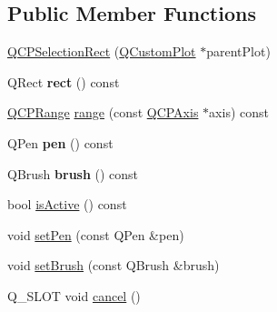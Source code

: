 \subsection*{Public Member Functions}
\begin{DoxyCompactItemize}
\item 
\mbox{\hyperlink{class_q_c_p_selection_rect_ade6ee59fabcc585a1e281eb527b01867}{Q\+C\+P\+Selection\+Rect}} (\mbox{\hyperlink{class_q_custom_plot}{Q\+Custom\+Plot}} $\ast$parent\+Plot)
\item 
\mbox{\label{class_q_c_p_selection_rect_a3812115ae4dfe2855bf1e58331c14805}} 
Q\+Rect {\bfseries rect} () const
\item 
\mbox{\hyperlink{class_q_c_p_range}{Q\+C\+P\+Range}} \mbox{\hyperlink{class_q_c_p_selection_rect_a23ab082ffa04be1dbf9afb9e633ab815}{range}} (const \mbox{\hyperlink{class_q_c_p_axis}{Q\+C\+P\+Axis}} $\ast$axis) const
\item 
\mbox{\label{class_q_c_p_selection_rect_ab4229f8faeaffba9617d2e6c4779b765}} 
Q\+Pen {\bfseries pen} () const
\item 
\mbox{\label{class_q_c_p_selection_rect_a9669c77c5796dea9dc089a088d50ebfb}} 
Q\+Brush {\bfseries brush} () const
\item 
bool \mbox{\hyperlink{class_q_c_p_selection_rect_ad27c1569c6ea8fa48e24b81e2a302df3}{is\+Active}} () const
\item 
void \mbox{\hyperlink{class_q_c_p_selection_rect_ada20b7fb1b2dcbe50523262636b06963}{set\+Pen}} (const Q\+Pen \&pen)
\item 
void \mbox{\hyperlink{class_q_c_p_selection_rect_ab0c66f1484418782efa01f4153611080}{set\+Brush}} (const Q\+Brush \&brush)
\item 
Q\+\_\+\+S\+L\+OT void \mbox{\hyperlink{class_q_c_p_selection_rect_af67bc58f4f5ce9a4dc420b9c42de235a}{cancel}} ()
\end{DoxyCompactItemize}
